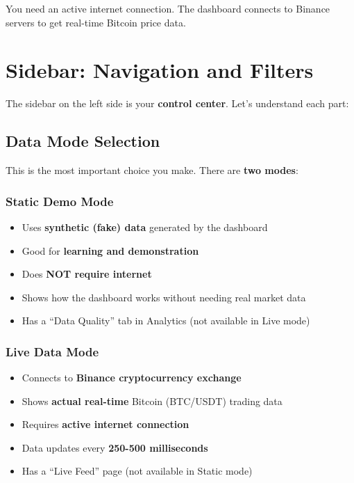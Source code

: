\documentclass[12pt,a4paper]{article}
\begin{document}
\begin{warningbox}
You need an active internet connection. The dashboard connects to Binance servers to get real-time Bitcoin price data.
\end{warningbox}

\section{Sidebar: Navigation and Filters}

The sidebar on the left side is your \textbf{control center}. Let's understand each part:

\subsection{Data Mode Selection}

This is the most important choice you make. There are \textbf{two modes}:

\subsubsection{Static Demo Mode}
\begin{itemize}
    \item Uses \textbf{synthetic (fake) data} generated by the dashboard
    \item Good for \textbf{learning and demonstration}
    \item Does \textbf{NOT require internet}
    \item Shows how the dashboard works without needing real market data
    \item Has a ``Data Quality'' tab in Analytics (not available in Live mode)
\end{itemize}

\subsubsection{Live Data Mode}
\begin{itemize}
    \item Connects to \textbf{Binance cryptocurrency exchange}
    \item Shows \textbf{actual real-time} Bitcoin (BTC/USDT) trading data
    \item Requires \textbf{active internet connection}
    \item Data updates every \textbf{250-500 milliseconds}
    \item Has a ``Live Feed'' page (not available in Static mode)
\end{itemize}
\end{document}
